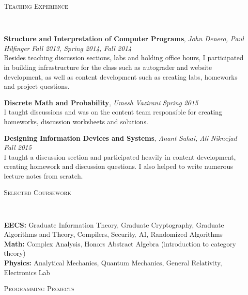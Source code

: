\documentclass[9pt]{article}
\newenvironment{changemargin}[2]{%
  \begin{list}{}{%
      \setlength{\topsep}{0pt}%
      \setlength{\leftmargin}{#1}%
      \setlength{\rightmargin}{#2}%
      \setlength{\listparindent}{\parindent}%
      \setlength{\itemindent}{\parindent}%
      \setlength{\parsep}{\parskip}%
    }%
  \item[]}{\end{list}
}
\newcommand{\lineover}{
  \begin{changemargin}{-0.05in}{-0.05in}
    \vspace*{-8pt}
    \hrulefill \\
    \vspace*{-2pt}
  \end{changemargin}
}
\newcommand{\header}[1]{
  \begin{changemargin}{-0.5in}{-0.5in}
    \scshape{#1}\\
    \lineover
  \end{changemargin}
}
\newenvironment{body} {
  \vspace*{-16pt}
  \begin{changemargin}{-0.25in}{-0.5in}
  }
  {\end{changemargin}
}
\begin{document}
\header{Teaching Experience}
\begin{body}
  \vspace{14pt}
  \textbf{Structure and Interpretation of Computer Programs}, \emph{John Denero, Paul Hilfinger} \hfill \emph{Fall 2013, Spring 2014, Fall 2014}\\
  Besides teaching discussion sections, labs and holding office hours, I
  participated in building infrastructure for the class such as autograder and
  website development, as well as content development such as creating labs,
  homeworks and project questions.

  \textbf{Discrete Math and Probability}, \emph{Umesh Vazirani} \hfill \emph{Spring 2015}\\
  I taught discussions and was on the content team responsible for creating
  homeworks, discussion worksheets and solutions.

  \textbf{Designing Information Devices and Systems}, \emph{Anant Sahai, Ali Niknejad} \hfill \emph{Fall 2015}\\
  I taught a discussion section and participated heavily in content development,
  creating homework and discussion questions. I also helped to write numerous
  lecture notes from scratch.
\end{body}
\smallskip

\header{Selected Coursework}
\begin{body}
  \vspace{14pt}
  \textbf{EECS:} Graduate Information Theory, Graduate Cryptography, Graduate Algorithms and Theory, Compilers, Security, AI, Randomized Algorithms \\
  \medskip
  \textbf{Math:} Complex Analysis, Honors Abstract Algebra (introduction to category theory) \\
  \medskip
  \textbf{Physics:} Analytical Mechanics, Quantum Mechanics, General Relativity, Electronics Lab \\
  \medskip
\end{body}

\newpage
\header{Programming Projects}
\end{document}
